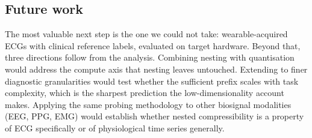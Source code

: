 \subsection{Future work}

The most valuable next step is the one we could not take: wearable-acquired
ECGs with clinical reference labels, evaluated on target hardware. Beyond
that, three directions follow from the analysis. Combining nesting with
quantisation would address the compute axis that nesting leaves untouched.
Extending to finer diagnostic granularities would test whether the sufficient
prefix scales with task complexity, which is the sharpest prediction the
low-dimensionality account makes. Applying the same probing methodology to
other biosignal modalities (EEG, PPG, EMG) would establish whether nested
compressibility is a property of ECG specifically or of physiological
time series generally.
